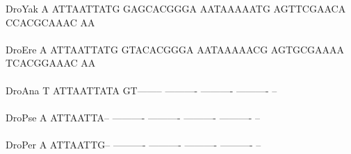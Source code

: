 \documentclass[11pt,twoside,reqno,a4paper]{article}
\begin{document}
{DroYak	A	ATTAATTATG	GAGCACGGGA	AATAAAAATG	AGTTCGAACA	CCACGCAAAC	AA\\
\hspace*{7\charwidth}\hspace*{1\charwidth}\hspace*{1\charwidth}\hspace*{1\charwidth}\hspace*{1\charwidth}\hspace*{1\charwidth}\hspace*{1\charwidth}\\
DroEre	A	ATTAATTATG	GTACACGGGA	AATAAAAACG	AGTGCGAAAA	TCACGGAAAC	AA\\
\hspace*{7\charwidth}\hspace*{1\charwidth}\hspace*{1\charwidth}\hspace*{1\charwidth}\hspace*{1\charwidth}\hspace*{1\charwidth}\hspace*{1\charwidth}\\
DroAna	T	ATTAATTATA	GT--------	----------	----------	----------	--\\
\hspace*{7\charwidth}\hspace*{1\charwidth}\hspace*{1\charwidth}\hspace*{1\charwidth}\hspace*{1\charwidth}\hspace*{1\charwidth}\hspace*{1\charwidth}\\
DroPse	A	ATTAATTA--	----------	----------	----------	----------	--\\
\hspace*{7\charwidth}\hspace*{1\charwidth}\hspace*{1\charwidth}\hspace*{1\charwidth}\hspace*{1\charwidth}\hspace*{1\charwidth}\hspace*{1\charwidth}\\
DroPer	A	ATTAATTG--	----------	----------	----------	----------	--\\
\hspace*{7\charwidth}\hspace*{1\charwidth}\hspace*{1\charwidth}\hspace*{1\charwidth}\hspace*{1\charwidth}\hspace*{1\charwidth}\hspace*{1\charwidth}\\
}
\end{document}
